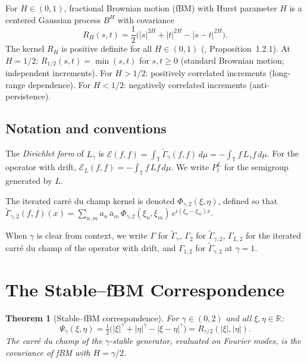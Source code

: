 \documentclass[11pt,a4paper]{article}
\theoremstyle{plain}
\newtheorem{theorem}{Theorem}[section]
\theoremstyle{definition}
\theoremstyle{remark}
\newcommand{\R}{\mathbb{R}}
\newcommand{\T}{\mathbb{T}}
\begin{document}
For $H \in (0,1)$, fractional Brownian motion (fBM) with Hurst
parameter $H$ is a centered Gaussian process $B^H$ with covariance
\begin{equation}\label{eq:fbm-cov}
  R_H(s,t)
  = \frac{1}{2}\bigl(|s|^{2H} + |t|^{2H} - |s-t|^{2H}\bigr).
\end{equation}
The kernel $R_H$ is positive definite for all $H \in (0,1)$
(\cite{Mishura2008}, Proposition~1.2.1).
At $H = 1/2$: $R_{1/2}(s,t) = \min(s,t)$ for $s,t \geq 0$
(standard Brownian motion; independent increments).
For $H > 1/2$: positively correlated increments (long-range dependence).
For $H < 1/2$: negatively correlated increments (anti-persistence).


\subsection{Notation and conventions}\label{sec:notation}

The \emph{Dirichlet form} of $L_\gamma$ is
$\mathcal{E}(f,f) = \int_\T \widetilde{\Gamma}_\gamma(f,f)\,d\mu
= -\int_\T f\,L_\gamma f\,d\mu$.
For the operator with drift, $\mathcal{E}_L(f,f)
= -\int_\T f\,Lf\,d\mu$.
We write $P_t^L$ for the semigroup generated by $L$.

The iterated carr\'e du champ kernel is denoted
$\Phi_{\gamma,2}(\xi,\eta)$, defined so that
$\widetilde{\Gamma}_{\gamma,2}(f,f)(x)
= \sum_{n,m} a_n\,\bar{a}_m\,\Phi_{\gamma,2}(\xi_n,\xi_m)\,
e^{i(\xi_n-\xi_m)x}$.

When $\gamma$ is clear from context, we write
$\Gamma$ for $\widetilde{\Gamma}_\gamma$,
$\Gamma_2$ for $\widetilde{\Gamma}_{\gamma,2}$,
$\Gamma_{L,2}$ for the iterated carr\'e du champ of the
operator with drift, and
$\Gamma_{1,2}$ for $\widetilde{\Gamma}_{\gamma,2}$ at $\gamma = 1$.


\section{The Stable--fBM Correspondence}\label{sec:duality}

\begin{theorem}[Stable--fBM correspondence]\label{thm:duality}
For $\gamma \in (0,2)$ and all $\xi, \eta \in \R$:
\begin{equation}\label{eq:duality}
  \Psi_\gamma(\xi,\eta)
  = \tfrac{1}{2}\bigl(|\xi|^\gamma + |\eta|^\gamma
  - |\xi - \eta|^\gamma\bigr)
  = R_{\gamma/2}(|\xi|, |\eta|).
\end{equation}
The carr\'e du champ of the $\gamma$-stable generator, evaluated
on Fourier modes, is the covariance of fBM with $H = \gamma/2$.
\end{theorem}
\end{document}
